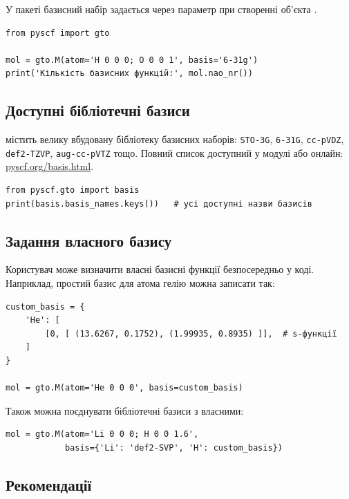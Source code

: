 У пакеті \PySCF{} базисний набір задається через параметр  при створенні об’єкта .

\begin{verbatim}
from pyscf import gto

mol = gto.M(atom='H 0 0 0; O 0 0 1', basis='6-31g')
print('Кількість базисних функцій:', mol.nao_nr())
\end{verbatim}

\subsection{Доступні бібліотечні базиси}

\PySCF{} містить велику вбудовану бібліотеку базисних наборів:
\texttt{STO-3G}, \texttt{6-31G}, \texttt{cc-pVDZ}, \texttt{def2-TZVP}, \texttt{aug-cc-pVTZ} тощо.
Повний список доступний у модулі 
або онлайн:
\href{https://pyscf.org/_modules/pyscf/gto/basis.html}{pyscf.org/basis.html}.

\begin{verbatim}
from pyscf.gto import basis
print(basis.basis_names.keys())   # усі доступні назви базисів
\end{verbatim}

\subsection{Задання власного базису}

Користувач може визначити власні базисні функції безпосередньо у коді.
Наприклад, простий базис для атома гелію можна записати так:

\begin{verbatim}
custom_basis = {
    'He': [
        [0, [ (13.6267, 0.1752), (1.99935, 0.8935) ]],  # s-функції
    ]
}

mol = gto.M(atom='He 0 0 0', basis=custom_basis)
\end{verbatim}

Також можна поєднувати бібліотечні базиси з власними:
\begin{verbatim}
mol = gto.M(atom='Li 0 0 0; H 0 0 1.6',
            basis={'Li': 'def2-SVP', 'H': custom_basis})
\end{verbatim}

\subsection{Рекомендації}

